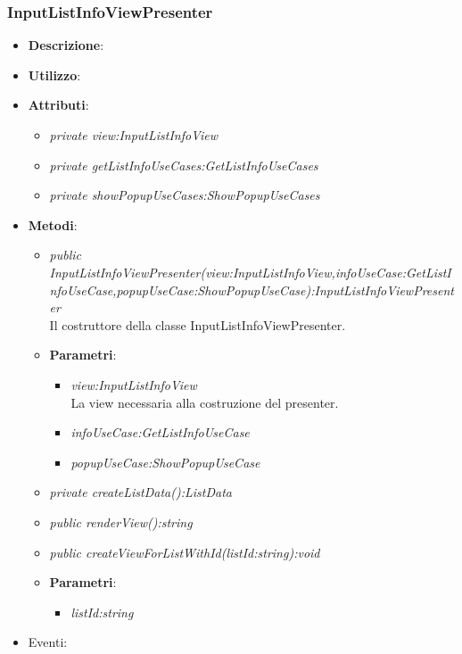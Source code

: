 \subsubsection{InputListInfoViewPresenter}
\begin{itemize}
\item \textbf{Descrizione}: 
\item \textbf{Utilizzo}:
\item \textbf{Attributi}: 	
	\begin{itemize}
	\item \textit{private view:InputListInfoView}\\
	
	\item \textit{private getListInfoUseCases:GetListInfoUseCases}\\
		
	\item \textit{private showPopupUseCases:ShowPopupUseCases}\\
	
	\end{itemize}
\item \textbf{Metodi}:
	\begin{itemize}	
	\item \textit{public InputListInfoViewPresenter(view:InputListInfoView,infoUseCase:GetListInfoUseCase,popupUseCase:ShowPopupUseCase):InputListInfoViewPresenter}\\
	Il costruttore della classe InputListInfoViewPresenter.
			\item{\textbf{Parametri}: \begin{itemize}
			\item \textit{view:InputListInfoView}\\
			La view necessaria alla costruzione del presenter.
			\item \textit{infoUseCase:GetListInfoUseCase}\\

			\item \textit{popupUseCase:ShowPopupUseCase}\\

			\end{itemize}}
	\item \textit{private createListData():ListData}\\
	 
	\item \textit{public renderView():string}\\

	\item \textit{public createViewForListWithId(listId:string):void}\\

			\item{\textbf{Parametri}: \begin{itemize}
			\item \textit{listId:string}\\

			\end{itemize}}
	\end{itemize}
\item{Eventi}:
\end{itemize}

